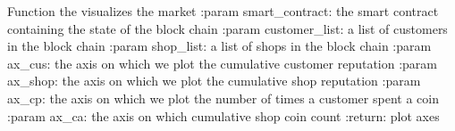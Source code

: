 \begin{DoxyVerb}Function the visualizes the market
:param smart_contract: the smart contract containing the state of the block chain
:param customer_list: a list of customers in the block chain
:param shop_list: a list of shops in the block chain
:param ax_cus: the axis on which we plot the cumulative customer reputation
:param ax_shop: the axis on which we plot the cumulative shop reputation
:param ax_cp: the axis on which we plot the number of times a customer spent a coin
:param ax_ca: the axis on which cumulative shop coin count
:return: plot axes
\end{DoxyVerb}
 